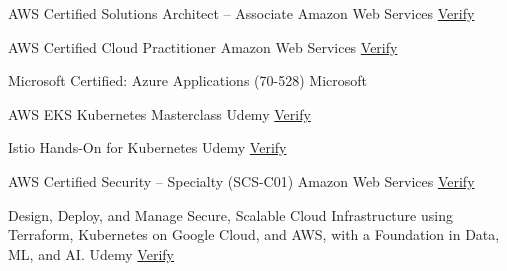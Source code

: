 
\begin{cvhonors}

  \cvhonor
    {AWS Certified Solutions Architect – Associate} %
    {Amazon Web Services} %
    {\href{https://www.credly.com/badges/0194fde7-f511-4761-8795-7150e783d14c?source=linked_in_profile}{\faCertificate\space Verify}} %
    {} %

  \cvhonor
    {AWS Certified Cloud Practitioner} %
    {Amazon Web Services} %
    {\href{https://www.credly.com/badges/8528ef32-7f12-4b28-9f4f-d22e4bbabdb6/linked_in_profile}{\faCertificate\space Verify}} %
    {} %

  \cvhonor
    {Microsoft Certified: Azure Applications (70-528)} %
    {Microsoft} %
    {} %
    {} %

  \cvhonor
    {AWS EKS Kubernetes Masterclass} %
    {Udemy} %
    {\href{https://www.udemy.com/certificate/UC-21b76729-85e4-44e4-9d4e-8fab25604d7e/}{\faCertificate\space Verify}} %
    {} %

  \cvhonor
    {Istio Hands-On for Kubernetes} %
    {Udemy} %
    {\href{https://www.udemy.com/certificate/UC-31b9d7ab-89d8-41d6-95b9-b045544cff46/}{\faCertificate\space Verify}} %
    {} %

  \cvhonor
    {AWS Certified Security – Specialty (SCS-C01)} %
    {Amazon Web Services} %
    {\href{https://www.udemy.com/certificate/UC-21b76729-85e4-44e4-9d4e-8fab25604d7e/}{\faCertificate\space Verify}} %
    {} %

  \cvhonor
    {Design, Deploy, and Manage Secure, Scalable Cloud Infrastructure using Terraform, Kubernetes on Google Cloud, and AWS, with a Foundation in Data, ML, and AI.} %
    {Udemy} %
    {\href{https://www.cloudskillsboost.google/public_profiles/6da45ab0-077b-43ed-adca-b7727f022c4b}{\faCertificate\space Verify}} %
    {}\\ %

\end{cvhonors}

